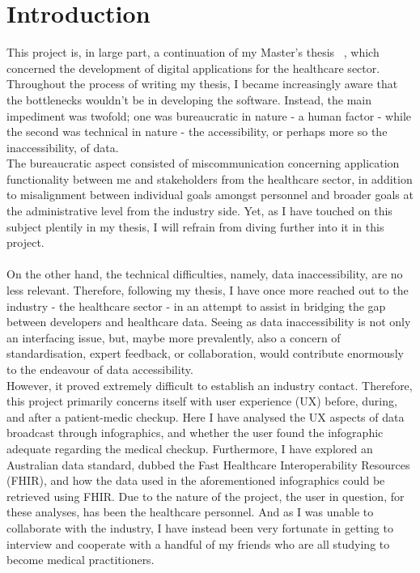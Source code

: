 \section{Introduction}
This project is, in large part, a continuation of my Master's thesis ~\cite{thesis}, which concerned the development of digital applications for the healthcare sector. Throughout the process of writing my thesis, I became increasingly aware that the bottlenecks wouldn't be in developing the software. Instead, the main impediment was twofold; one was bureaucratic in nature - a human factor - while the second was technical in nature - the accessibility, or perhaps more so the inaccessibility, of data.
\\
The bureaucratic aspect consisted of miscommunication concerning application functionality between me and stakeholders from the healthcare sector, in addition to misalignment between individual goals amongst personnel and broader goals at the administrative level from the industry side. Yet, as I have touched on this subject plentily in my thesis, I will refrain from diving further into it in this project. 
\\
\\
On the other hand, the technical difficulties, namely, data inaccessibility, are no less relevant. Therefore, following my thesis, I have once more reached out to the industry - the healthcare sector - in an attempt to assist in bridging the gap between developers and healthcare data. Seeing as data inaccessibility is not only an interfacing issue, but, maybe more prevalently, also a concern of standardisation, expert feedback, or collaboration, would contribute enormously to the endeavour of data accessibility.
\\
However, it proved extremely difficult to establish an industry contact. Therefore, this project primarily concerns itself with user experience (UX) before, during, and after a patient-medic checkup. Here I have analysed the UX aspects of data broadcast through infographics, and whether the user found the infographic adequate regarding the medical checkup. Furthermore, I have explored an Australian data standard, dubbed the Fast Healthcare Interoperability Resources (FHIR), and how the data used in the aforementioned infographics could be retrieved using FHIR.
Due to the nature of the project, the user in question, for these analyses, has been the healthcare personnel. And as I was unable to collaborate with the industry, I have instead been very fortunate in getting to interview and cooperate with a handful of my friends who are all studying to become medical practitioners.   
